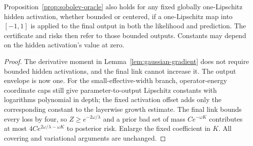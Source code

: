 \begin{corollary}
\label{cor:sobolev-bounded-observation}
Proposition~\ref{prop:sobolev-oracle} also holds for any fixed globally one-Lipschitz hidden activation, whether bounded or centered, if a one-Lipschitz map into $[-1,1]$ is applied to the final output in both the likelihood and prediction. The certificate and risks then refer to those bounded outputs. Constants may depend on the hidden activation's value at zero.
\end{corollary}
\begin{proof}
The derivative moment in Lemma~\ref{lem:gaussian-gradient} does not require bounded hidden activations, and the final link cannot increase it. The output envelope is now one. For the small-effective-width branch, operator-energy coordinate caps still give parameter-to-output Lipschitz constants with logarithms polynomial in depth; the fixed activation offset adds only the corresponding constant to the layerwise growth estimate. The final link bounds every loss by four, so $Z\ge e^{-2\omega/\lambda}$ and a prior bad set of mass $Ce^{-\omega K}$ contributes at most $4C e^{2\omega/\lambda-\omega K}$ to posterior risk. Enlarge the fixed coefficient in $K$. All covering and variational arguments are unchanged.
\end{proof}
